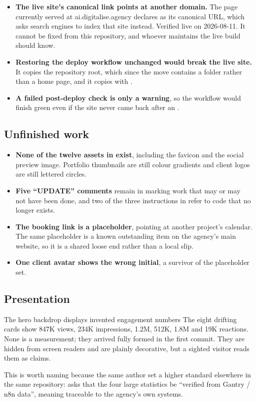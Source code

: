 \documentclass[11pt,a4paper]{article}
\begin{document}
\begin{itemize}
\item \textbf{The live site's canonical link points at another domain.} The page
  currently served at ai.digitalise.agency declares  as its
  canonical URL, which asks search engines to index that site instead. Verified
  live on 2026-08-11. It cannot be fixed from this repository, and whoever
  maintains the live build should know.
\item \textbf{Restoring the deploy workflow unchanged would break the live site.}
  It copies the repository root, which since the move contains a folder rather
  than a home page, and it copies with .
\item \textbf{A failed post-deploy check is only a warning}, so the workflow would
  finish green even if the site never came back after an .
\end{itemize}

\subsection{Unfinished work}

\begin{itemize}
\item \textbf{None of the twelve assets in  exist}, including the
  favicon and the social preview image. Portfolio thumbnails are still colour
  gradients and client logos are still lettered circles.
\item \textbf{Five ``UPDATE'' comments} remain in  marking work
  that may or may not have been done, and two of the three instructions in
   refer to code that no longer exists.
\item \textbf{The booking link is a placeholder}, pointing at another project's
  calendar. The same placeholder is a known outstanding item on the agency's main
  website, so it is a shared loose end rather than a local slip.
\item \textbf{One client avatar shows the wrong initial}, a survivor of the
  placeholder set.
\end{itemize}

\subsection{Presentation}

\begin{honest}{The hero backdrop displays invented engagement numbers}
The eight drifting cards show 847K views, 234K impressions, 1.2M, 512K, 1.8M and
19K reactions. None is a measurement; they arrived fully formed in the first
commit. They are hidden from screen readers and are plainly decorative, but a
sighted visitor reads them as claims.

This is worth naming because the same author set a higher standard elsewhere in
the same repository:  asks that the four large statistics be
``verified from Gantry / n8n data'', meaning traceable to the agency's own
systems.
\end{honest}
\end{document}
